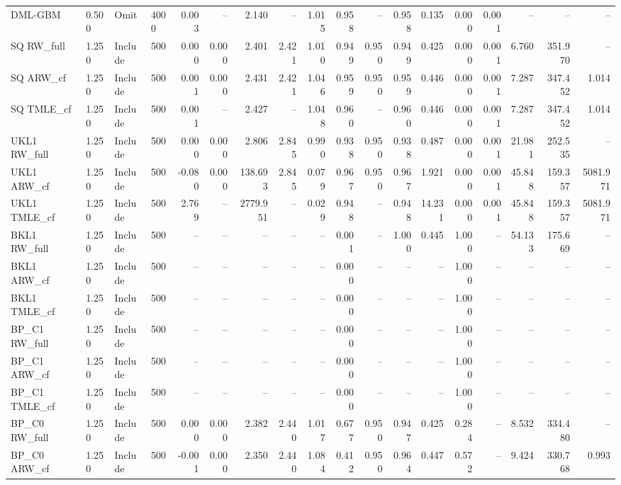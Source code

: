 \begin{tabular}{llllrrrrrrrrrrrrrr}
DML-GBM & 0.500 & Omit & 4000 & 0.003 & -- & 2.140 & -- & 1.015 & 0.958 & -- & 0.958 & 0.135 & 0.000 & 0.001 & -- & -- & -- \\
SQ RW\_full & 1.250 & Include & 500 & 0.000 & 0.000 & 2.401 & 2.421 & 1.010 & 0.949 & 0.950 & 0.949 & 0.425 & 0.000 & 0.001 & 6.760 & 351.970 & -- \\
SQ ARW\_cf & 1.250 & Include & 500 & 0.001 & 0.000 & 2.431 & 2.421 & 1.046 & 0.959 & 0.950 & 0.959 & 0.446 & 0.000 & 0.001 & 7.287 & 347.452 & 1.014 \\
SQ TMLE\_cf & 1.250 & Include & 500 & 0.001 & -- & 2.427 & -- & 1.048 & 0.960 & -- & 0.960 & 0.446 & 0.000 & 0.001 & 7.287 & 347.452 & 1.014 \\
UKL1 RW\_full & 1.250 & Include & 500 & 0.000 & 0.000 & 2.806 & 2.845 & 0.990 & 0.938 & 0.950 & 0.938 & 0.487 & 0.000 & 0.001 & 21.981 & 252.535 & -- \\
UKL1 ARW\_cf & 1.250 & Include & 500 & -0.080 & 0.000 & 138.693 & 2.845 & 0.079 & 0.967 & 0.950 & 0.967 & 1.921 & 0.000 & 0.001 & 45.848 & 159.357 & 5081.971 \\
UKL1 TMLE\_cf & 1.250 & Include & 500 & 2.769 & -- & 2779.951 & -- & 0.029 & 0.948 & -- & 0.948 & 14.231 & 0.000 & 0.001 & 45.848 & 159.357 & 5081.971 \\
BKL1 RW\_full & 1.250 & Include & 500 & -- & -- & -- & -- & -- & 0.001 & -- & 1.000 & 0.445 & 1.000 & -- & 54.133 & 175.669 & -- \\
BKL1 ARW\_cf & 1.250 & Include & 500 & -- & -- & -- & -- & -- & 0.000 & -- & -- & -- & 1.000 & -- & -- & -- & -- \\
BKL1 TMLE\_cf & 1.250 & Include & 500 & -- & -- & -- & -- & -- & 0.000 & -- & -- & -- & 1.000 & -- & -- & -- & -- \\
BP\_C1 RW\_full & 1.250 & Include & 500 & -- & -- & -- & -- & -- & 0.000 & -- & -- & -- & 1.000 & -- & -- & -- & -- \\
BP\_C1 ARW\_cf & 1.250 & Include & 500 & -- & -- & -- & -- & -- & 0.000 & -- & -- & -- & 1.000 & -- & -- & -- & -- \\
BP\_C1 TMLE\_cf & 1.250 & Include & 500 & -- & -- & -- & -- & -- & 0.000 & -- & -- & -- & 1.000 & -- & -- & -- & -- \\
BP\_C0 RW\_full & 1.250 & Include & 500 & 0.000 & 0.000 & 2.382 & 2.440 & 1.017 & 0.677 & 0.950 & 0.947 & 0.425 & 0.284 & -- & 8.532 & 334.480 & -- \\
BP\_C0 ARW\_cf & 1.250 & Include & 500 & -0.001 & 0.000 & 2.350 & 2.440 & 1.084 & 0.412 & 0.950 & 0.964 & 0.447 & 0.572 & -- & 9.424 & 330.768 & 0.993 \\

\end{tabular}
